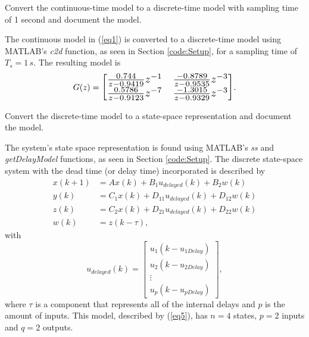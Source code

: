 \documentclass[12pt]{article}
\newenvironment{problem}[2][Problem]{\begin{trivlist}
		\item[\hskip \labelsep {\bfseries #1}\hskip \labelsep {\bfseries #2.}]}{\end{trivlist}}
\begin{document}
\begin{problem}{2} Convert the continuous-time model to a discrete-time model with sampling time of 1 second and document the model. \end{problem}

The continuous model in (\ref{eq1}) is converted to a discrete-time model using MATLAB's \textit{c2d} function, as seen in Section \ref{code:Setup}, for a sampling time of $T_s = 1 \,s$. The resulting model is
\renewcommand\arraystretch{1.4}
\begin{equation}
G(z) =
\scalebox{1.3}{$  
	\begin{bmatrix}
	\frac{0.744}{z-0.9419}z^{-1} & \frac{-0.8789}{z-0.9535}z^{-3}\\
	\frac{0.5786}{z-0.9123}z^{-7} & \frac{-1.3015}{z-0.9329}z^{-3}
	\end{bmatrix}$}. \label{eq5}
\end{equation}
\renewcommand\arraystretch{1}

\begin{problem}{3} Convert the discrete-time model to a state-space representation and document the model. \end{problem}

The system's state space representation is found using MATLAB's \textit{ss} and \textit{getDelayModel} functions, as seen in Section \ref{code:Setup}. The discrete state-space system with the dead time (or delay time) incorporated is described by
\begin{subequations}
	\begin{align}
	x(k+1) &=A x(k) + B_1 u_{delayed}(k) + B_2 w(k) \label{eq6a}\\
	y(k) &= C_1 x(k) + D_{11} u_{delayed}(k) + D_{12} w(k) \label{eq6b}\\
	z(k) &= C_2 x(k) + D_{21} u_{delayed}(k) + D_{22} w(k) \label{eq6c}\\
	w(k) &= z(k-\tau), \label{eq6d}
	\end{align}
	\label{eq6}
\end{subequations}
with
\begin{equation}
u_{delayed}(k) = 
\begin{bmatrix}
u_1(k-u_{1 Delay})\\
u_2(k-u_{2 Delay})\\
\vdots\\
u_p(k-u_{p Delay})
\end{bmatrix}, \label{eq7}
\end{equation}
where $\tau$ is a component that represents all of the internal delays and $ p $ is the amount of inputs. This model, described by (\ref{eq5}), has $n=4$ states, $p=2$ inputs and $q=2$ outputs.
\end{document}

